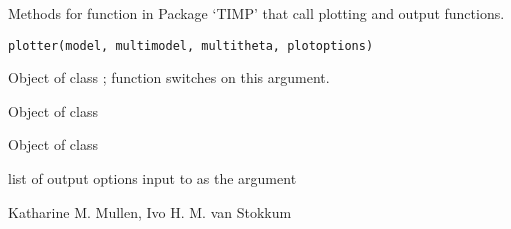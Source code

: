 \begin{Description}\relax
Methods for function  in Package `TIMP' that 
call plotting and output functions.
\end{Description}
\begin{Usage}
\begin{verbatim}
plotter(model, multimodel, multitheta, plotoptions)
\end{verbatim}
\end{Usage}
\begin{Arguments}
\begin{ldescription}
\item[\code{model}] Object of class ; function switches on this 
argument. 
\item[\code{multimodel}] Object of class 
\item[\code{multitheta}] Object of class 
\item[\code{plotoptions}] list of output options 
input to  as the argument 
\end{ldescription}
\end{Arguments}
\begin{Author}\relax
Katharine M. Mullen, Ivo H. M. van Stokkum
\end{Author}
\begin{SeeAlso}\relax
{}
\end{SeeAlso}

